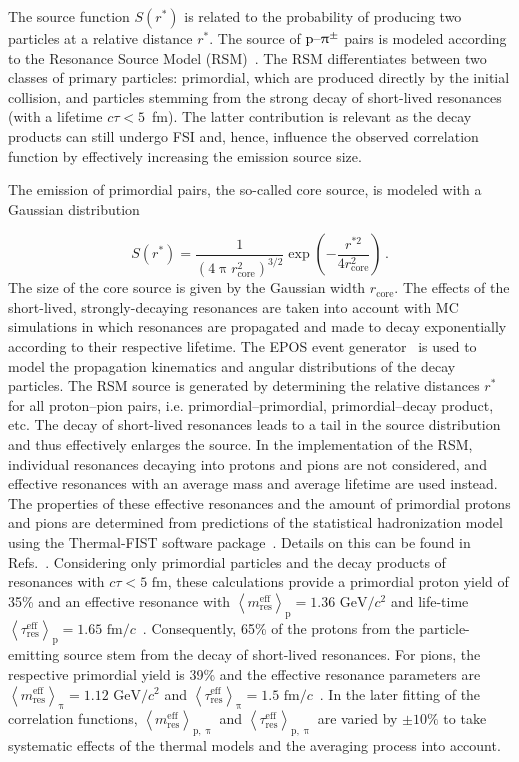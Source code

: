 \documentclass[ALICE,manyauthors]{cernphprep}
\begin{document}
The source function $S(r^*)$ is related to the probability of producing two particles at a relative distance $r^*$. The source of $\text{p--}\uppi^\pm$ pairs is modeled according to the Resonance Source Model (RSM)~\cite{ppSourceErratum}. The RSM differentiates between two classes of primary particles: primordial, which are produced directly by the initial collision, and particles stemming from the strong decay of short-lived resonances (with a lifetime $c\tau < 5$~fm). The latter contribution is relevant as the decay products can still undergo FSI and, hence, influence the observed correlation function by effectively increasing the emission source size.

The emission of primordial pairs, the so-called core source, is modeled with a Gaussian distribution

\begin{equation}
    S(r^*) = \frac{1}{(4\uppi r_{\text{core}}^2)^{3/2}} \exp\left( - \frac{r^{*2}}{4r_{\text{core}}^2} \right)\,.
\end{equation}
The size of the core source is given by the Gaussian width $r_\text{core}$.
The effects of the short-lived, strongly-decaying resonances are taken into account with MC simulations in which resonances are propagated and made to decay exponentially according to their respective lifetime. The EPOS event generator~\cite{EPOS} is used to model the propagation kinematics and angular distributions of the decay particles. The RSM source is generated by determining the relative distances $r^*$ for all proton--pion pairs, i.e. primordial--primordial, primordial--decay product, etc. The decay of short-lived resonances leads to a tail in the source distribution and thus effectively enlarges the source. In the implementation of the RSM, individual resonances decaying into protons and pions are not considered, and effective resonances with an average mass and average lifetime are used instead. The properties of these effective resonances and the amount of primordial protons and pions are determined from predictions of the statistical hadronization model using the Thermal-FIST software package~\cite{ThermalFist}. Details on this can be found in Refs.~\cite{ppSourceErratum, ALICE:2023sjd}. Considering only primordial particles and the decay products of resonances with $c\tau<5\text{ fm}$, these calculations provide a primordial proton yield of 35\% and an effective resonance with $\left<m_{\text{res}}^{\text{eff}}\right>_{\text{p}} = 1.36 \text{ GeV}/c^2$ and life-time $\left<\tau_{\text{res}}^{\text{eff}}\right>_{\text{p}} = 1.65 \text{ fm}/c$~\cite{ppSourceErratum}. Consequently, 65\% of the protons from the particle-emitting source stem from the decay of short-lived resonances. For pions, the respective primordial yield is 39\% and the effective resonance parameters are $\left<m_{\text{res}}^{\text{eff}}\right>_{\uppi} = 1.12 \text{ GeV}/c^2$ and $\left<\tau_{\text{res}}^{\text{eff}}\right>_{\uppi} = 1.5 \text{ fm}/c$~\cite{ALICE:2023sjd}. In the later fitting of the correlation functions, $\left<m_{\text{res}}^{\text{eff}}\right>_{\text{p},\uppi}$ and $\left<\tau_{\text{res}}^{\text{eff}}\right>_{\text{p},\uppi}$ are varied by $\pm 10\%$ to take systematic effects of the thermal models and the averaging process into account.
\end{document}
